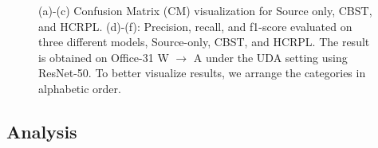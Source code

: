 \documentclass[a4paper,fleqn]{cas-dc}
\begin{document}
\begin{figure}
		\caption{(a)-(c) Confusion Matrix (CM) visualization for Source only, CBST, and HCRPL. (d)-(f):  Precision, recall, and f1-score evaluated on three different models, Source-only, CBST, and HCRPL. The result is obtained on Office-31 W $\rightarrow$ A under the UDA setting using ResNet-50. To better visualize results, we arrange the categories in alphabetic order.
		}\label{fig6}
	\end{figure}
	
	
	\subsection{Analysis}
	
\end{document}
